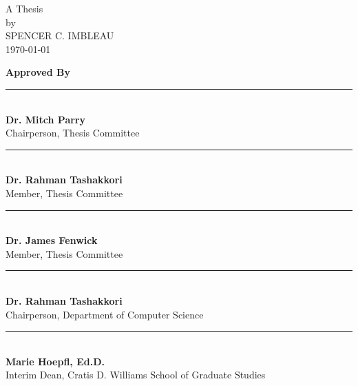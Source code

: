 \vfill
\begin{center}
\Large{\thesistitle}\normalsize
\vfill
A Thesis\\
by\\
SPENCER C. IMBLEAU\\
\today
\end{center}
\vfill

\begin{flushleft}
\textbf{Approved By}\\
\bigskip
\bigskip


\rule{3in}{.1pt}\\
\textbf{Dr. Mitch Parry}\\
Chairperson, Thesis Committee\\
\bigskip
\bigskip

\rule{3in}{.1pt}\\
\textbf{Dr. Rahman Tashakkori}\\
Member, Thesis Committee\\
\bigskip
\bigskip

\rule{3in}{.1pt}\\
\textbf{Dr. James Fenwick}\\
Member, Thesis Committee\\
\bigskip
\bigskip

\rule{3in}{.1pt}\\
\textbf{Dr. Rahman Tashakkori}\\
Chairperson, Department of Computer Science\\
\bigskip
\bigskip

\rule{3in}{.1pt}\\
\textbf{Marie Hoepfl, Ed.D.}\\
Interim Dean, Cratis D. Williams School of Graduate Studies
\end{flushleft}